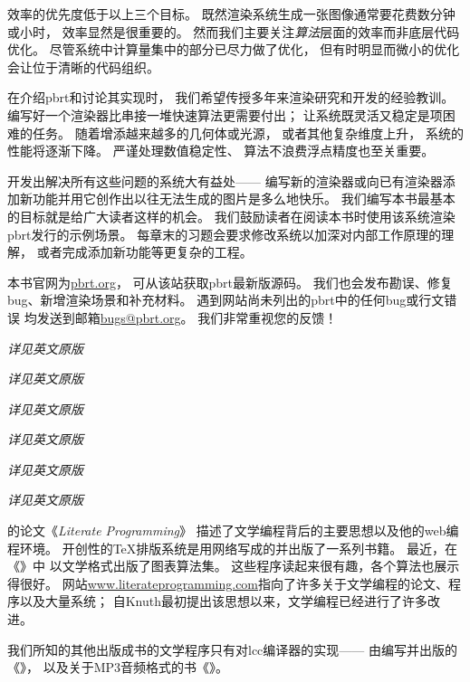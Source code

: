 效率的优先度低于以上三个目标。
既然渲染系统生成一张图像通常要花费数分钟或小时，
效率显然是很重要的。
然而我们主要关注{\itshape 算法}层面的效率而非底层代码优化。
尽管系统中计算量集中的部分已尽力做了优化，
但有时明显而微小的优化会让位于清晰的代码组织。

在介绍pbrt和讨论其实现时，
我们希望传授多年来渲染研究和开发的经验教训。
编写好一个渲染器比串接一堆快速算法更需要付出；
让系统既灵活又稳定是项困难的任务。
随着增添越来越多的几何体或光源，
或者其他复杂维度上升，
系统的性能将逐渐下降。
严谨处理数值稳定性、
算法不浪费浮点精度也至关重要。

开发出解决所有这些问题的系统大有益处——
编写新的渲染器或向已有渲染器添加新功能并用它创作出以往无法生成的图片是多么地快乐。
我们编写本书最基本的目标就是给广大读者这样的机会。
我们鼓励读者在阅读本书时使用该系统渲染pbrt发行的示例场景。
每章末的习题会要求修改系统以加深对内部工作原理的理解，
或者完成添加新功能等更复杂的工程。

本书官网为\href{www.pbrt.org}{\ttfamily pbrt.org}，
可从该站获取pbrt最新版源码。
我们也会发布勘误、修复bug、新增渲染场景和补充材料。
遇到网站尚未列出的pbrt中的任何bug或行文错误
均发送到邮箱\href{mailto:bugs@pbrt.org}{\url{bugs@pbrt.org}}。
我们非常重视您的反馈！\\


{\itshape 详见英文原版}\\


{\itshape 详见英文原版}\\


{\itshape 详见英文原版}\\


{\itshape 详见英文原版}\\


{\itshape 详见英文原版}\\


{\itshape 详见英文原版}\\


\citet{10.1093/comjnl/27.2.97}的论文《\emph{Literate Programming}》
描述了文学编程背后的主要思想以及他的{\ttfamily web}编程环境。
开创性的\TeX 排版系统是用网络写成的并出版了一系列书籍\citep{10.5555/536126,10.5555/536123}。
最近，\citet{10.1145/164984}在《》中
以文学格式出版了图表算法集。
这些程序读起来很有趣，各个算法也展示得很好。
网站\url{www.literateprogramming.com}指向了许多关于文学编程的论文、程序以及大量系统；
自Knuth最初提出该思想以来，文学编程已经进行了许多改进。


我们所知的其他出版成书的文学程序只有对lcc编译器的实现——
由\citet{10.5555/555424}编写并出版的《》，
以及\citet{10.5555/1036653}关于MP3音频格式的书《》。

